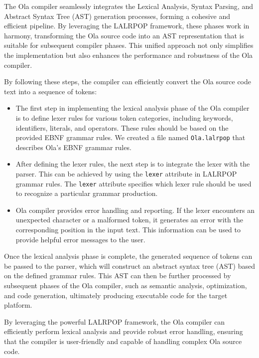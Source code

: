 The Ola compiler seamlessly integrates the Lexical Analysis, Syntax Parsing, and Abstract Syntax Tree (AST) generation processes, forming a cohesive and efficient pipeline. By leveraging the LALRPOP framework, these phases work in harmony, transforming the Ola source code into an AST representation that is suitable for subsequent compiler phases. This unified approach not only simplifies the implementation but also enhances the performance and robustness of the Ola compiler.

By following these steps, the compiler can efficiently convert the Ola source code text into a sequence of tokens:

\begin{itemize}

  \item The first step in implementing the lexical analysis phase of the Ola compiler is to define lexer rules for various token categories, including keywords, identifiers, literals, and operators. These rules should be based on the provided EBNF grammar rules. We created a file named \verb|Ola.lalrpop| that describes Ola's EBNF grammar rules.

  \item After defining the lexer rules, the next step is to integrate the lexer with the parser. This can be achieved by using the \texttt{lexer} attribute in LALRPOP grammar rules. The \texttt{lexer} attribute specifies which lexer rule should be used to recognize a particular grammar production.

  \item Ola compiler provides error handling and reporting. If the lexer encounters an unexpected character or a malformed token, it generates an error with the corresponding position in the input text. This information can be used to provide helpful error messages to the user.

\end{itemize}

Once the lexical analysis phase is complete, the generated sequence of tokens can be passed to the parser, which will construct an abstract syntax tree (AST) based on the defined grammar rules. This AST can then be further processed by subsequent phases of the Ola compiler, such as semantic analysis, optimization, and code generation, ultimately producing executable code for the target platform.

By leveraging the powerful LALRPOP framework, the Ola compiler can efficiently perform lexical analysis and provide robust error handling, ensuring that the compiler is user-friendly and capable of handling complex Ola source code.
